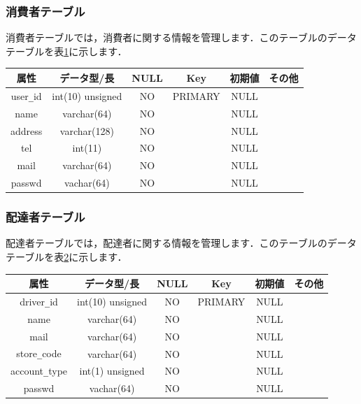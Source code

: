 \documentclass[a4j,titlepage]{jarticle}
\begin{document}
\subsubsection{消費者テーブル}
消費者テーブルでは，消費者に関する情報を管理します．このテーブルのデータテーブルを表\ref{userTable}に示します．
\begin{table}[htb]
  \label{userTable}
  \begin{center}
    \begin{tabular}{|c|c|c|c|c|c|} \hline
      属性 & データ型/長 & NULL & Key & 初期値 & その他 \\ \hline \hline
      user\verb|_|id & int(10) unsigned & NO & PRIMARY & NULL & \\ \hline
      name & varchar(64) & NO &   & NULL & \\ \hline
      address & varchar(128) & NO &   & NULL & \\ \hline
      tel & int(11) & NO &   & NULL & \\ \hline
      mail & varchar(64) & NO &   & NULL & \\ \hline
      passwd & vachar(64) & NO &   & NULL & \\ \hline
    \end{tabular}
  \end{center}
\end{table}

\subsubsection{配達者テーブル}
配達者テーブルでは，配達者に関する情報を管理します．このテーブルのデータテーブルを表\ref{driverTable}に示します．
\begin{table}[htb]
  \label{driverTable}
  \begin{center}
    \begin{tabular}{|c|c|c|c|c|c|} \hline
      属性 & データ型/長 & NULL & Key & 初期値 & その他 \\ \hline \hline
      driver\verb|_|id & int(10) unsigned & NO & PRIMARY & NULL & \\ \hline
      name & varchar(64) & NO &   & NULL & \\ \hline
      mail & varchar(64) & NO &   & NULL & \\ \hline
      store\verb|_|code & varchar(64) & NO &   & NULL & \\ \hline
      account\verb|_|type & int(1) unsigned & NO &   & NULL & \\ \hline
      passwd & vachar(64) & NO &   & NULL & \\ \hline
    \end{tabular}
  \end{center}
\end{table}
\end{document}
